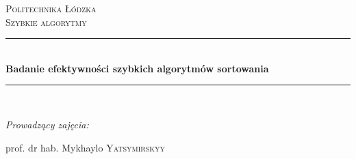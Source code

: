 \pgfplotsset{compat=newest} %


\setcounter{secnumdepth}{4}
\setcounter{tocdepth}{4}
\addto\captionsenglish{%
  \renewcommand{\contentsname}%
    {Spis treści}%
}

\newcommand{\norm}[1]{\lvert #1 \rvert}


\begin{titlepage}

\newcommand{\HRule}{\rule{\linewidth}{0.5mm}} %

\center %
 

\textsc{\LARGE Politechnika Łódzka}\\[1.5cm] %
\textsc{\Large Szybkie algorytmy}\\[0.5cm] %


\HRule \\[0.4cm]
{ \huge \bfseries Badanie efektywności szybkich algorytmów sortowania  }\\[0.4cm] %
\HRule \\[1.5cm]
 



\begin{flushleft}\large

\begin{center} \emph{Prowadzący zajęcia:} \end{center}
\begin{center}
prof. dr hab. Mykhaylo \textsc{Yatsymirskyy}
\end{center} %
\end{flushleft}



\end{titlepage}
